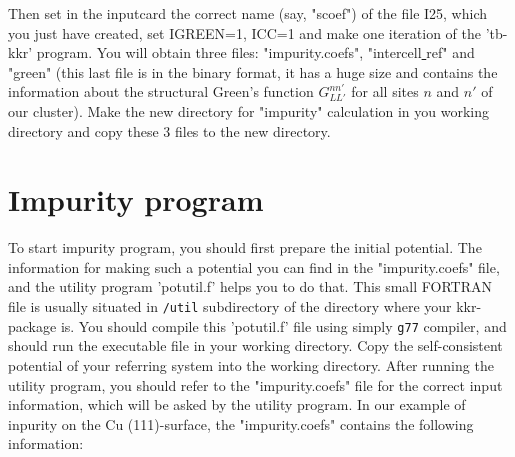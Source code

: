   Then set in the inputcard the correct name (say, "scoef") of the file I25, 
which you just have created, set IGREEN=1, ICC=1 and make one iteration of the 
'tb-kkr' program. You will obtain three files: "impurity.coefs", 
"intercell\underline{{ }}ref" and "green" (this last file is in the binary 
format, it has a huge size and contains the information
about the structural Green's function $G_{LL'}^{nn'}$ for all sites
$n$ and $n'$ of our cluster). Make the new directory for "impurity" 
calculation in you working directory and copy these 3 files to the new 
directory. 

\section{Impurity program}

To start impurity program, you should first prepare the initial potential.
The information for making such a potential you can find in 
the "impurity.coefs" file, and the utility program 'potutil.f' helps you to do 
that. This small FORTRAN file is usually situated in {\tt /util} subdirectory 
of the directory where your kkr-package is. You should compile this 'potutil.f'
file using simply {\tt g77} compiler, and should run the executable file
in your working directory. Copy the self-consistent potential of your 
referring system into the  working directory. After running the utility 
program, you should refer to the "impurity.coefs" file for the correct input 
information, which will be asked by the utility program. In our example of 
inpurity on the Cu (111)-surface, the "impurity.coefs" contains the following 
information:
\bigskip

